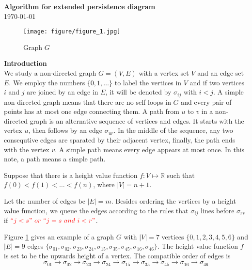 \documentclass[a4paper,12pt]{article}
\title{}
\numberwithin{equation}{section}
\begin{document}
\begin{center}
  \textbf{\Large Algorithm for extended persistence diagram}\\
  \today
\end{center}

\noindent

	\begin{figure}[!hbtp]
		\centering				
		\texttt{[image: figure/figure\_1.jpg]}
		\caption{Graph $G$}
		\label{fig:graph_G}		
	\end{figure}
	
	\noindent
	\textbf{Introduction}\\
	
	We study a non-directed graph $G=(V,E)$ with a vertex set $V$ and an edge set $E$. We employ the numbers $\{0,1,\ldots\}$ to label the vertices in $V$ and if two vertices $i$ and $j$ are joined by an edge in $E$, it will be denoted by $\sigma_{ij}$ with $i<j$. A simple non-directed graph means that there are no self-loops in $G$ and every pair of points has at most one edge connecting them.  A path from $u$ to $v$ in a non-directed graph is an alternative sequence of vertices and edges. It starts  with the vertex $u$, then follows by an edge $\sigma_{ur}$. In the middle of the sequence, any two consequtive edges are sparated by their adjacent vertex, finally, the path ends with the vertex $v$. A simple path means every edge appears at most once. In this note, a path means a simple path. 
	
	Suppose that there is a height value function $f: V \mapsto \mathbb{R}$ such that $f(0) < f(1) < \ldots <f(n)$, where $\vert V \vert = n+1$. 
	
	Let the number of edges be $\vert E \vert =m$. Besides ordering the vertices by a height value function, we queue the edges according to the rules that $\sigma_{ij}$ lines before $\sigma_{rs}$ if $\color{red} ``j<s" \  or \  ``j=s \ and \ i<r"$.	
	
	Figure \ref{fig:graph_G} gives an example of a graph $G$ with $\vert V \vert =7$ vertices $\{0,1,2,3,4,5,6\}$ and $\vert E \vert =9$ edges $\{\sigma_{01}, \sigma_{02}, \sigma_{23}, \sigma_{24}, \sigma_{15}, \sigma_{35}, \sigma_{45}, \sigma_{16}, \sigma_{46} \}$. The height value function $f$ is set to be the upwards height of a vertex. The compatible order of edges is
	$$ \sigma_{01} \to \sigma_{02} \to \sigma_{23} \to \sigma_{24} \to \sigma_{15} \to \sigma_{35} \to \sigma_{45} \to \sigma_{16} \to \sigma_{46}$$\\
	
\end{document}
